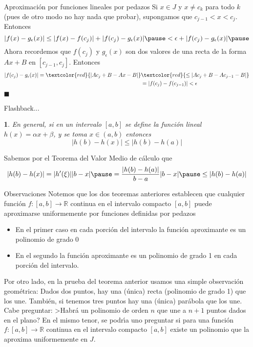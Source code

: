 \documentclass[xcolor=dvipsnames,10pt,handout, draft]{beamer}
\newcommand{\rz}{\mathbb R}
\newtheorem*{afirma}{}
\begin{document}
\begin{frame}{Aproximaci\'on por funciones lineales por pedazos}
Si $x\in J$ y $x\neq c_k$ para todo $k$ (pues de otro modo no hay nada que probar),  supongamos que $c_{j-1}<x<c_j$. \pause Entonces 
$$|f(x)-g_\epsilon(x)|\leq|f(x)-f(c_j)|+|f(c_j)-g_\epsilon(x)|\pause<\epsilon+|f(c_j)-g_\epsilon(x)|\pause$$
Ahora recordemos que $f(c_j)$ y $g_\epsilon(x)$ son dos valores de una recta de la forma $Ax+B$ en $[c_{j-1},c_j]$.
\pause\vskip5pt
Entonces 
\begin{align*}
|f(c_j)-g_\epsilon(x)|=\textcolor{red}{|Ac_j+B-Ax-B|}&\textcolor{red}{\leq|Ac_j+B-Ac_{j-1}-B|}\\
&=|f(c_j)-f(c_{j-1})|<\epsilon
\end{align*}
\hfill$\blacksquare$
\end{frame}


\begin{frame}{Flashback...}
\begin{afirma}
En general, si en un intervalo $[a,b]$ se define la funci\'on lineal $h(x)=\alpha x+\beta$, y se toma $x\in (a,b)$ entonces
$$|h(b)-h(x)|\leq|h(b)-h(a)|$$
\end{afirma}
\pause

Sabemos por el Teorema del Valor Medio de c\'alculo que 
$$|h(b)-h(x)|=|h'(\xi)||b-x|\pause=\frac{|h(b)-h(a)|}{b-a}|b-x|\pause\leq|h(b)-h(a)|$$
\end{frame}

\begin{frame}{Observaciones}\pause
Notemos que los dos teoremas anteriores establecen que cualquier funci\'on $f:[a,b]\to\rz$ continua en el intervalo compacto $[a,b]$ puede aproximarse uniformemente por funciones definidas por pedazos\pause
\begin{itemize}
\item En el primer caso en cada porci\'on del intervalo la funci\'on aproximante es un polinomio de grado 0\pause
\item En el segundo la funci\'on aproximante es un polinomio de grado 1 en cada porci\'on del intervalo.
\end{itemize}
\pause\vskip6pt 
Por otro lado, en la prueba del teorema anterior usamos una simple observaci\'on geom\'etrica: Dados dos puntos, hay una (\'unica) recta (polinomio de grado 1) que los une. \pause Tambi\'en, si tenemos tres puntos hay una (\'unica) par\'abola que los une.
\pause\vskip5pt 
Cabe preguntar: >Habr\'a un polinomio de orden $n$ que une a $n+1$ puntos dados en el plano?
\pause\vskip5pt 
En el mismo tenor, se podr\'\i a uno preguntar si para una funci\'on $f:[a,b]\to\rz$ continua en el intervalo compacto $[a,b]$ existe un polinomio que la aproxima uniformemente en $J$.
\end{frame}
\end{document}
